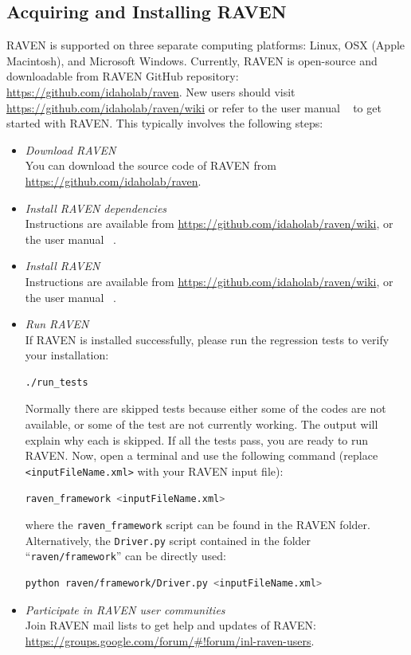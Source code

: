 \subsection{Acquiring and Installing RAVEN}
RAVEN is supported on three separate computing platforms: Linux, OSX (Apple Macintosh), and Microsoft Windows.
Currently, RAVEN is open-source and downloadable from RAVEN GitHub repository: \url{https://github.com/idaholab/raven}.
New users should visit \url{https://github.com/idaholab/raven/wiki} or refer to the user manual ~\cite{RAVENuserManual}
to get started with RAVEN. This typically involves the following steps:
\begin{itemize}
  \item \textit{Download RAVEN}
    \\ You can download the source code of RAVEN from \url{https://github.com/idaholab/raven}.
  \item \textit{Install RAVEN dependencies}
    \\ Instructions are available from \url{https://github.com/idaholab/raven/wiki}, or the user manual ~\cite{RAVENuserManual}.
  \item \textit{Install RAVEN}
    \\ Instructions are available from \url{https://github.com/idaholab/raven/wiki}, or the user manual ~\cite{RAVENuserManual}.
  \item \textit{Run RAVEN}
    \\ If RAVEN is installed successfully, please run the regression tests to verify your installation:
    \begin{lstlisting}[language=bash]
      ./run_tests
    \end{lstlisting}
    Normally there are skipped tests because either some of the codes are not available, or some of the test are not
    currently working. The output will explain why each is skipped. If all the tests pass, you are ready to run RAVEN.
    Now, open a terminal and use the following command (replace \texttt{<inputFileName.xml>} with your
    RAVEN input file):
    \begin{lstlisting}[language=bash]
      raven_framework <inputFileName.xml>
    \end{lstlisting}
    where the \texttt{raven\_framework} script can be found in the RAVEN folder. Alternatively, the \texttt{Driver.py} script
    contained in the folder ``\texttt{raven/framework}'' can be directly used:
    \begin{lstlisting}[language=bash]
      python raven/framework/Driver.py <inputFileName.xml>
    \end{lstlisting}
  \item \textit{Participate in RAVEN user communities}
    \\ Join RAVEN mail lists to get help and updates of RAVEN: \url{https://groups.google.com/forum/#!forum/inl-raven-users}.
\end{itemize}

